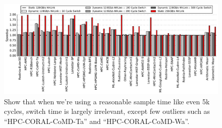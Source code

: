 






\begin{figure}[tp]
    \centering
    \includegraphics[width=1.0\textwidth]{figures/plot_nvlink_switch_time_sample_time5000.pdf}
    \caption{Show that when we're using a reasonable sample time like even 5k 
cycles, switch time is largely irrelevant, except few 
outliers such as ``HPC-CORAL-CoMD-Ta'' and ``HPC-CORAL-CoMD-Wa''.}
    \label{fig:switchtime}
\end{figure}